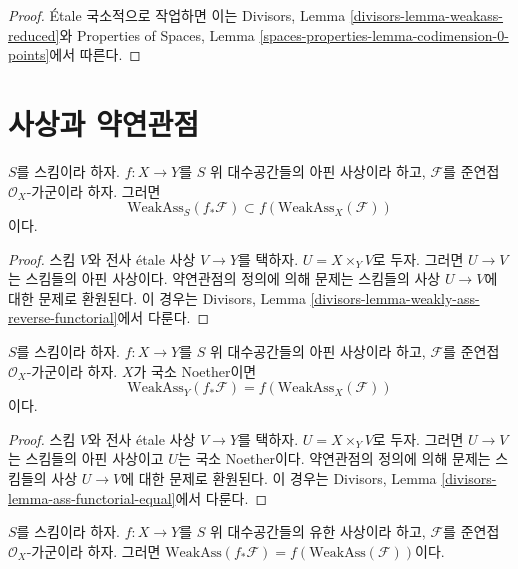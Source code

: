 \begin{proof}
\'Etale 국소적으로 작업하면 이는 Divisors, Lemma
\ref{divisors-lemma-weakass-reduced}와 Properties of Spaces, Lemma
\ref{spaces-properties-lemma-codimension-0-points}에서 따른다.
\end{proof}


\section{사상과 약연관점}
\label{section-morphisms-weakly-associated}

\begin{lemma}
\label{lemma-weakly-ass-reverse-functorial}
$S$를 스킴이라 하자. $f : X \to Y$를 $S$ 위 대수공간들의 아핀 사상이라
하고, $\mathcal{F}$를 준연접 $\mathcal{O}_X$-가군이라 하자. 그러면
$$
\text{WeakAss}_S(f_*\mathcal{F}) \subset f(\text{WeakAss}_X(\mathcal{F}))
$$
이다.
\end{lemma}

\begin{proof}
스킴 $V$와 전사 \'etale 사상 $V \to Y$를 택하자.
$U = X \times_Y V$로 두자. 그러면 $U \to V$는 스킴들의 아핀 사상이다.
약연관점의 정의에 의해 문제는 스킴들의 사상 $U \to V$에 대한 문제로
환원된다. 이 경우는 Divisors, Lemma
\ref{divisors-lemma-weakly-ass-reverse-functorial}에서 다룬다.
\end{proof}

\begin{lemma}
\label{lemma-ass-functorial-equal}
$S$를 스킴이라 하자. $f : X \to Y$를 $S$ 위 대수공간들의 아핀 사상이라
하고, $\mathcal{F}$를 준연접 $\mathcal{O}_X$-가군이라 하자.
$X$가 국소 Noether이면
$$
\text{WeakAss}_Y(f_*\mathcal{F}) =
f(\text{WeakAss}_X(\mathcal{F}))
$$
이다.
\end{lemma}

\begin{proof}
스킴 $V$와 전사 \'etale 사상 $V \to Y$를 택하자.
$U = X \times_Y V$로 두자. 그러면 $U \to V$는 스킴들의 아핀 사상이고
$U$는 국소 Noether이다. 약연관점의 정의에 의해 문제는 스킴들의 사상
$U \to V$에 대한 문제로 환원된다. 이 경우는 Divisors, Lemma
\ref{divisors-lemma-ass-functorial-equal}에서 다룬다.
\end{proof}

\begin{lemma}
\label{lemma-weakly-associated-finite}
$S$를 스킴이라 하자. $f : X \to Y$를 $S$ 위 대수공간들의 유한 사상이라
하고, $\mathcal{F}$를 준연접 $\mathcal{O}_X$-가군이라 하자. 그러면
$\text{WeakAss}(f_*\mathcal{F}) = f(\text{WeakAss}(\mathcal{F}))$이다.
\end{lemma}

